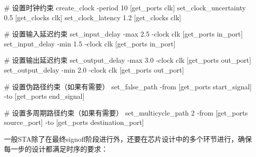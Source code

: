 \begin{CodeBlock}[language=BookTcl]
# 设置时钟约束
create_clock -period 10 [get_ports clk]
set_clock_uncertainty 0.5 [get_clocks clk]
set_clock_latency 1.2 [get_clocks clk]

# 设置输入延迟约束
set_input_delay -max 2.5 -clock clk [get_ports in_port]
set_input_delay -min 1.5 -clock clk [get_ports in_port]

# 设置输出延迟约束
set_output_delay -max 3.0 -clock clk [get_ports out_port]
set_output_delay -min 2.0 -clock clk [get_ports out_port]

# 设置伪路径约束（如果有需要）
set_false_path -from [get_ports start_signal] -to [get_ports end_signal]

# 设置多周期路径约束（如果有需要）
set_multicycle_path 2 -from [get_ports source_port] -to [get_ports destination_port]
\end{CodeBlock}

一般STA除了在最终signoff阶段进行外，还要在芯片设计中的多个环节进行，确保每一步的设计都满足时序的要求：

